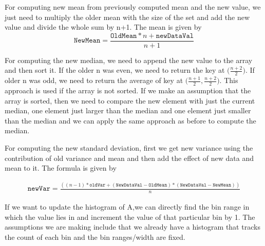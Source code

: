 \begin{tcolorbox}[breakable]
	\begin{sol}

		For computing new mean from previously computed mean and the
		new value, we just need to multiply the older mean with the
		size of the set and add the new value and divide the whole sum
		by n+1. The mean is given by
		\begin{equation}
			\texttt{NewMean}=\frac{\texttt{OldMean}*n+\texttt{newDataVal}}{n+1}
		\end{equation}

		For computing the new median, we need to append the new value
		to the array and then sort it. If the older n was even, we need
		to return the key at $\big(\frac{n+2}{2}\big)$. If older n was
		odd, we need to return the average of key at
		$\big(\frac{n+1}{2},\frac{n+2}{2}\big)$. This approach is used
		if the array is not sorted. If we make an assumption that the
		array is sorted, then we need to compare the new element with
		just the current median, one element just larger than the
		median and one element just smaller than the median and we can
		apply the same approach as before to compute the median. \par
		For computing the new standard deviation, first we get new
		variance using the contribution of old variance and mean and
		then add the effect of new data and mean to it. The formula is
		given by

		\begin{align}
			\texttt{newVar}=\frac{((n-1)*\texttt{oldVar}+(\texttt{NewDataVal}-\texttt{OldMean})*(\texttt{NewDataVal}-\texttt{NewMean}))}{n}
		\end{align}

		\par If we want to update the histogram of A,we can directly
		find the bin range in which the value lies in and increment the
		value of that particular bin by 1. The assumptions we are
		making include that we already have a histogram that tracks the
		count of each bin and the bin ranges/width are fixed.
	\end{sol}
\end{tcolorbox}
